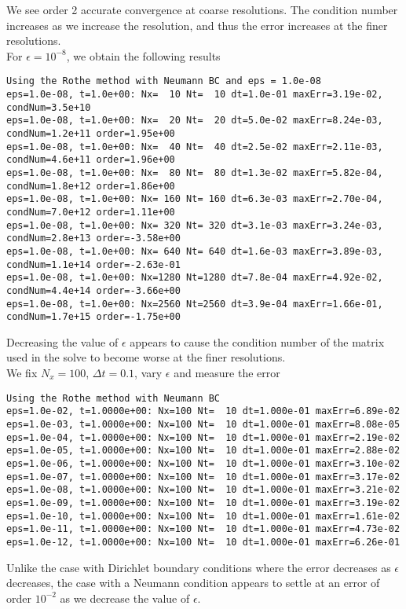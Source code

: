 \documentclass[11pt]{article}
\numberwithin{equation}{section}
\newcommand{\dt}{\Delta t}
\newcommand{\Nx}{N_x}
\begin{document}
We see order 2 accurate convergence at coarse resolutions. The condition number increases as we increase the resolution, and thus the error increases at the finer resolutions. \\

For $\epsilon = 10^{-8}$, we obtain the following results
\begin{footnotesize}
	\begin{Verbatim}[frame = single]
Using the Rothe method with Neumann BC and eps = 1.0e-08
eps=1.0e-08, t=1.0e+00: Nx=  10 Nt=  10 dt=1.0e-01 maxErr=3.19e-02, condNum=3.5e+10
eps=1.0e-08, t=1.0e+00: Nx=  20 Nt=  20 dt=5.0e-02 maxErr=8.24e-03, condNum=1.2e+11 order=1.95e+00
eps=1.0e-08, t=1.0e+00: Nx=  40 Nt=  40 dt=2.5e-02 maxErr=2.11e-03, condNum=4.6e+11 order=1.96e+00
eps=1.0e-08, t=1.0e+00: Nx=  80 Nt=  80 dt=1.3e-02 maxErr=5.82e-04, condNum=1.8e+12 order=1.86e+00
eps=1.0e-08, t=1.0e+00: Nx= 160 Nt= 160 dt=6.3e-03 maxErr=2.70e-04, condNum=7.0e+12 order=1.11e+00
eps=1.0e-08, t=1.0e+00: Nx= 320 Nt= 320 dt=3.1e-03 maxErr=3.24e-03, condNum=2.8e+13 order=-3.58e+00
eps=1.0e-08, t=1.0e+00: Nx= 640 Nt= 640 dt=1.6e-03 maxErr=3.89e-03, condNum=1.1e+14 order=-2.63e-01
eps=1.0e-08, t=1.0e+00: Nx=1280 Nt=1280 dt=7.8e-04 maxErr=4.92e-02, condNum=4.4e+14 order=-3.66e+00
eps=1.0e-08, t=1.0e+00: Nx=2560 Nt=2560 dt=3.9e-04 maxErr=1.66e-01, condNum=1.7e+15 order=-1.75e+00
	\end{Verbatim}
\end{footnotesize}
Decreasing the value of $\epsilon$ appears to cause the condition number of the matrix used in the solve to become worse at the finer resolutions. \\

We fix $\Nx = 100$, $\dt=0.1$, vary $\epsilon$ and measure the error 
\begin{footnotesize}
	\begin{Verbatim}[frame = single]
Using the Rothe method with Neumann BC
eps=1.0e-02, t=1.0000e+00: Nx=100 Nt=  10 dt=1.000e-01 maxErr=6.89e-02
eps=1.0e-03, t=1.0000e+00: Nx=100 Nt=  10 dt=1.000e-01 maxErr=8.08e-05
eps=1.0e-04, t=1.0000e+00: Nx=100 Nt=  10 dt=1.000e-01 maxErr=2.19e-02
eps=1.0e-05, t=1.0000e+00: Nx=100 Nt=  10 dt=1.000e-01 maxErr=2.88e-02
eps=1.0e-06, t=1.0000e+00: Nx=100 Nt=  10 dt=1.000e-01 maxErr=3.10e-02
eps=1.0e-07, t=1.0000e+00: Nx=100 Nt=  10 dt=1.000e-01 maxErr=3.17e-02
eps=1.0e-08, t=1.0000e+00: Nx=100 Nt=  10 dt=1.000e-01 maxErr=3.21e-02
eps=1.0e-09, t=1.0000e+00: Nx=100 Nt=  10 dt=1.000e-01 maxErr=3.19e-02
eps=1.0e-10, t=1.0000e+00: Nx=100 Nt=  10 dt=1.000e-01 maxErr=1.61e-02
eps=1.0e-11, t=1.0000e+00: Nx=100 Nt=  10 dt=1.000e-01 maxErr=4.73e-02
eps=1.0e-12, t=1.0000e+00: Nx=100 Nt=  10 dt=1.000e-01 maxErr=6.26e-01
	\end{Verbatim}
\end{footnotesize}
Unlike the case with Dirichlet boundary conditions where the error decreases as $\epsilon$ decreases, the case with a Neumann condition appears to settle at an error of order $10^{-2}$ as we decrease the value of $\epsilon$. 
\end{document}
